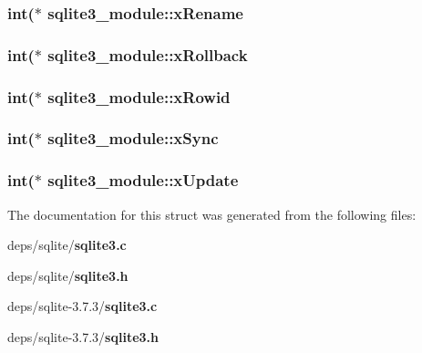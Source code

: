 \subsubsection{\setlength{\rightskip}{0pt plus 5cm}int($\ast$ \bf{sqlite3\_\-module::x\-Rename}}\label{structsqlite3__module_9c0bc0e78b88cde6a6efef5539f8a813}


\subsubsection{\setlength{\rightskip}{0pt plus 5cm}int($\ast$ \bf{sqlite3\_\-module::x\-Rollback}}\label{structsqlite3__module_b3362bac28bf869ef24340da324f0832}


\subsubsection{\setlength{\rightskip}{0pt plus 5cm}int($\ast$ \bf{sqlite3\_\-module::x\-Rowid}}\label{structsqlite3__module_2280ce46a41483d8454a0b971b2a28c6}


\subsubsection{\setlength{\rightskip}{0pt plus 5cm}int($\ast$ \bf{sqlite3\_\-module::x\-Sync}}\label{structsqlite3__module_3be1fb97de096d7aaffe6f2303eca71c}


\subsubsection{\setlength{\rightskip}{0pt plus 5cm}int($\ast$ \bf{sqlite3\_\-module::x\-Update}}\label{structsqlite3__module_9c0ae465b08a6b8e82b6c783483094fc}




The documentation for this struct was generated from the following files:\begin{CompactItemize}
\item 
deps/sqlite/\bf{sqlite3.c}\item 
deps/sqlite/\bf{sqlite3.h}\item 
deps/sqlite-3.7.3/\bf{sqlite3.c}\item 
deps/sqlite-3.7.3/\bf{sqlite3.h}\end{CompactItemize}
